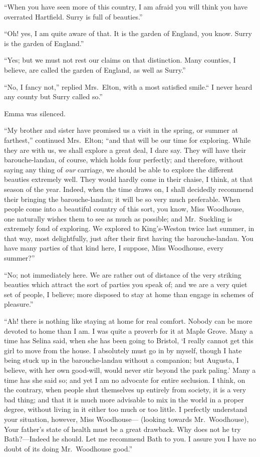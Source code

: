 ``When you have seen more of this country, I am afraid you will think
you have overrated Hartfield.  Surry is full of beauties.''

``Oh! yes, I am quite aware of that.  It is the garden of England,
you know.  Surry is the garden of England.''

``Yes; but we must not rest our claims on that distinction.
Many counties, I believe, are called the garden of England,
as well as Surry.''

``No, I fancy not,'' replied Mrs.\ Elton, with a most satisfied smile.``
I never heard any county but Surry called so.''

Emma was silenced.

``My brother and sister have promised us a visit in the spring,
or summer at farthest,'' continued Mrs.\ Elton; ``and that will be
our time for exploring.  While they are with us, we shall explore
a great deal, I dare say.  They will have their barouche-landau,
of course, which holds four perfectly; and therefore, without saying
any thing of \emph{our} carriage, we should be able to explore the different
beauties extremely well.  They would hardly come in their chaise,
I think, at that season of the year.  Indeed, when the time draws on,
I shall decidedly recommend their bringing the barouche-landau;
it will be so very much preferable.  When people come into a beautiful
country of this sort, you know, Miss Woodhouse, one naturally wishes
them to see as much as possible; and Mr.\ Suckling is extremely fond
of exploring.  We explored to King's-Weston twice last summer,
in that way, most delightfully, just after their first having the
barouche-landau.  You have many parties of that kind here, I suppose,
Miss Woodhouse, every summer?''

``No; not immediately here.  We are rather out of distance of the very
striking beauties which attract the sort of parties you speak of;
and we are a very quiet set of people, I believe; more disposed
to stay at home than engage in schemes of pleasure.''

``Ah! there is nothing like staying at home for real comfort.
Nobody can be more devoted to home than I am.  I was quite
a proverb for it at Maple Grove.  Many a time has Selina said,
when she has been going to Bristol, `I really cannot get this girl
to move from the house.  I absolutely must go in by myself, though I
hate being stuck up in the barouche-landau without a companion;
but Augusta, I believe, with her own good-will, would never stir
beyond the park paling.'  Many a time has she said so; and yet I
am no advocate for entire seclusion.  I think, on the contrary,
when people shut themselves up entirely from society, it is a very
bad thing; and that it is much more advisable to mix in the world in
a proper degree, without living in it either too much or too little.
I perfectly understand your situation, however, Miss Woodhouse---%
(looking towards Mr.\ Woodhouse), Your father's state of health must
be a great drawback.  Why does not he try Bath?---Indeed he should.
Let me recommend Bath to you.  I assure you I have no doubt of its doing
Mr.\ Woodhouse good.''

